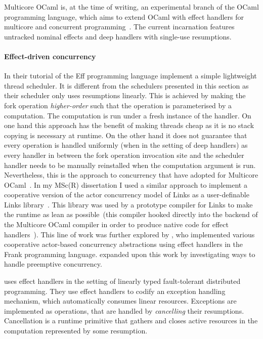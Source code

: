 \documentclass[12pt,phd,lfcs,twoside,openright,logo,leftchapter,normalheadings]{infthesis}
\theoremstyle{plain}
\theoremstyle{definition}
\begin{document}
Multicore OCaml is, at the time of writing, an experimental branch of
the OCaml programming language, which aims to extend OCaml with effect
handlers for multicore and concurrent
programming~\cite{DolanWM14,DolanWSYM15}. The current incarnation
features untracked nominal effects and deep handlers with single-use
resumptions.


\paragraph{Effect-driven concurrency}
In their tutorial of the Eff programming language \citet{BauerP15}
implement a simple lightweight thread scheduler. It is different from
the schedulers presented in this section as their scheduler only uses
resumptions linearly. This is achieved by making the fork operation
\emph{higher-order} such that the operation is parameterised by a
computation. The computation is run under a fresh instance of the
handler. On one hand this approach has the benefit of making threads
cheap as it is no stack copying is necessary at runtime. On the other
hand it does not guarantee that every operation is handled uniformly
(when in the setting of deep handlers) as every handler in between the
fork operation invocation site and the scheduler handler needs to be
manually reinstalled when the computation argument is
run. Nevertheless, this is the approach to concurrency that
\citet{DolanWSYM15} have adopted for Multicore
OCaml~\cite{DolanWSYM15}.
%
In my MSc(R) dissertation I used a similar approach to implement a
cooperative version of the actor concurrency model of Links as a
user-definable Links library~\cite{Hillerstrom16}. This library was
used by a prototype compiler for Links to make the runtime as lean as
possible~(this compiler hooked directly into the backend of the
Multicore OCaml compiler in order to produce native code for effect
handlers~\cite{HillerstromL16}).
%
This line of work was further explored by \citet{Convent17}, who
implemented various cooperative actor-based concurrency abstractions
using effect handlers in the Frank programming
language. \citet{Poulson20} expanded upon this work by investigating
ways to handle preemptive concurrency.

\citet{FowlerLMD19} uses effect handlers in the setting of linearly
typed fault-tolerant distributed programming. They use effect handlers
to codify an exception handling mechanism, which automatically
consumes linear resources. Exceptions are implemented as operations,
that are handled by \emph{cancelling} their resumptions. Cancellation
is a runtime primitive that gathers and closes active resources in the
computation represented by some resumption.
\end{document}

